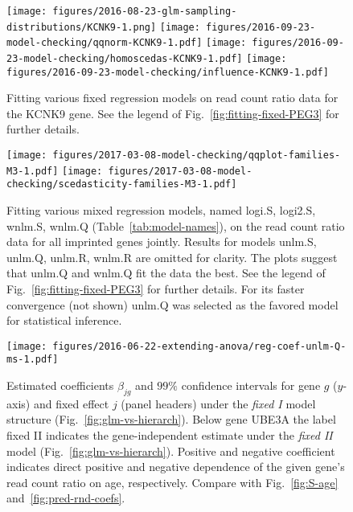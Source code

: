 \documentclass[letterpaper]{article}
\begin{document}
\begin{figure}[H]
\begin{center}
\texttt{[image: figures/2016-08-23-glm-sampling-distributions/KCNK9-1.png]}
\texttt{[image: figures/2016-09-23-model-checking/qqnorm-KCNK9-1.pdf]}
\texttt{[image: figures/2016-09-23-model-checking/homoscedas-KCNK9-1.pdf]}
\texttt{[image: figures/2016-09-23-model-checking/influence-KCNK9-1.pdf]}
\end{center}
\caption{
Fitting various fixed regression models on read count ratio data for the KCNK9
gene.  See the legend of Fig.~\ref{fig:fitting-fixed-PEG3} for further details.
}
\label{fig:fitting-fixed-KCNK9}
\end{figure}

\begin{figure}[H]
\begin{center}
\texttt{[image: figures/2017-03-08-model-checking/qqplot-families-M3-1.pdf]}
\texttt{[image: figures/2017-03-08-model-checking/scedasticity-families-M3-1.pdf]}
\end{center}
\caption{
Fitting various mixed regression models, named logi.S, logi2.S, wnlm.S,
wnlm.Q (Table~\ref{tab:model-names}), on the read count ratio data for all
imprinted genes jointly.  Results for models unlm.S, unlm.Q, unlm.R, wnlm.R are omitted for
clarity.  The plots suggest
that unlm.Q and wnlm.Q fit the data the best.  See the legend of
Fig.~\ref{fig:fitting-fixed-PEG3} for further details. For its faster convergence 
(not shown) unlm.Q was selected as the favored model for statistical inference.
}
\label{fig:fitting-mixed}
\end{figure}

\begin{figure}[H]
\begin{center}
\texttt{[image: figures/2016-06-22-extending-anova/reg-coef-unlm-Q-ms-1.pdf]}
\end{center}
\caption{
Estimated coefficients \(\beta_{jg}\) and \(99\%\) confidence intervals for
gene \(g\) (\(y\)-axis) and fixed effect \(j\) (panel headers) under the
\emph{fixed I} model structure (Fig.~\ref{fig:glm-vs-hierarch}).  Below gene
UBE3A the label fixed II indicates the gene-independent estimate under the \emph{fixed II} model
(Fig.~\ref{fig:glm-vs-hierarch}).  Positive and negative coefficient indicates
direct positive and negative dependence of the given gene's read count ratio
on age, respectively.  Compare with Fig.~\ref{fig:S-age}
and~\ref{fig:pred-rnd-coefs}.
}
\label{fig:pred-fixed-coefs}
\end{figure}
\end{document}
